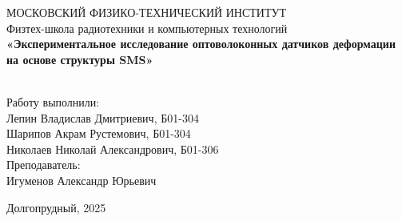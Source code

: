 \begin{center}
МОСКОВСКИЙ ФИЗИКО-ТЕХНИЧЕСКИЙ ИНСТИТУТ \\

\hfill \break
Физтех-школа радиотехники и компьютерных технологий\\
\vspace{5cm}
\large{\textbf{«Экспериментальное исследование оптоволоконных датчиков деформации на основе структуры SMS»}}\\
\hfill \break
\\
\end{center}

\vspace{5cm}
 
\begin{flushright}
Работу выполнили:\\
Лепин Владислав Дмитриевич, Б01-304\\
Шарипов Акрам Рустемович, Б01-304\\
Николаев Николай Александрович, Б01-306\\
Преподаватель:\\
Игуменов Александр Юрьевич\\
\end{flushright}
 
\vfill

\begin{center} Долгопрудный, 2025 \end{center}

\thispagestyle{empty}
\newpage
